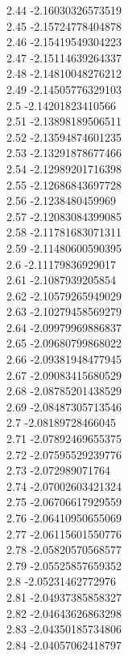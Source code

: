 {2.44	-2.16030326573519\\
2.45	-2.15724778404878\\
2.46	-2.15419549304223\\
2.47	-2.15114639264337\\
2.48	-2.14810048276212\\
2.49	-2.14505776329103\\
2.5	-2.14201823410566\\
2.51	-2.13898189506511\\
2.52	-2.13594874601235\\
2.53	-2.13291878677466\\
2.54	-2.12989201716398\\
2.55	-2.12686843697728\\
2.56	-2.1238480459969\\
2.57	-2.12083084399085\\
2.58	-2.11781683071311\\
2.59	-2.11480600590395\\
2.6	-2.11179836929017\\
2.61	-2.1087939205854\\
2.62	-2.10579265949029\\
2.63	-2.10279458569279\\
2.64	-2.09979969886837\\
2.65	-2.09680799868022\\
2.66	-2.09381948477945\\
2.67	-2.09083415680529\\
2.68	-2.08785201438529\\
2.69	-2.08487305713546\\
2.7	-2.08189728466045\\
2.71	-2.07892469655375\\
2.72	-2.07595529239776\\
2.73	-2.072989071764\\
2.74	-2.07002603421324\\
2.75	-2.06706617929559\\
2.76	-2.06410950655069\\
2.77	-2.06115601550776\\
2.78	-2.05820570568577\\
2.79	-2.05525857659352\\
2.8	-2.05231462772976\\
2.81	-2.04937385858327\\
2.82	-2.04643626863298\\
2.83	-2.04350185734806\\
2.84	-2.04057062418797\\
}
